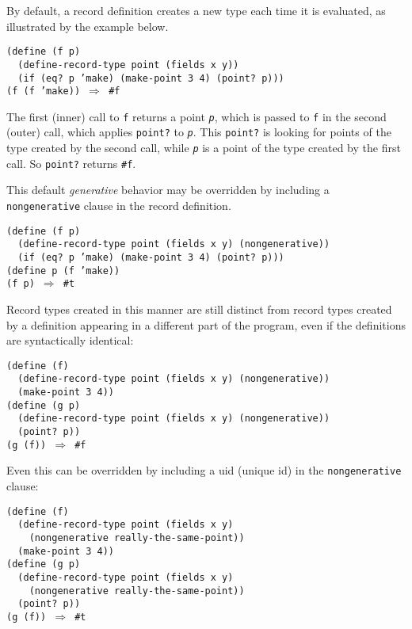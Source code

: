 By default, a record definition creates a new type each time it is
evaluated, as illustrated by the example below.


\begin{alltt}
(define (f p)
  (define-record-type point (fields x y))
  (if (eq? p 'make) (make-point 3 4) (point? p)))
(f (f 'make)) \(\Rightarrow\) \#{}f
\end{alltt}


The first (inner) call to \texttt{f} returns a point \texttt{\textit{p}}, which is
passed to \texttt{f} in the second (outer) call, which applies
\texttt{point?} to \texttt{\textit{p}}.
This \texttt{point?} is looking for points of the type created
by the second call, while \texttt{\textit{p}} is a point of the type created by
the first call.
So \texttt{point?} returns \texttt{\#{}f}.


\label{records_s3}\label{records_s4}\label{records_s5}This default \textit{generative} behavior may be overridden by including a
\texttt{nongenerative} clause in the record definition.


\begin{alltt}
(define (f p)
  (define-record-type point (fields x y) (nongenerative))
  (if (eq? p 'make) (make-point 3 4) (point? p)))
(define p (f 'make))
(f p) \(\Rightarrow\) \#{}t
\end{alltt}


Record types created in this manner are still distinct from record
types created by a definition appearing in a different part of the
program, even if the definitions are syntactically identical:


\begin{alltt}
(define (f)
  (define-record-type point (fields x y) (nongenerative))
  (make-point 3 4))
(define (g p)
  (define-record-type point (fields x y) (nongenerative))
  (point? p))
(g (f)) \(\Rightarrow\) \#{}f
\end{alltt}


\label{records_s6}\label{records_page_record_uid}Even this can be overridden by including a uid (unique id) in
the \texttt{nongenerative} clause:


\begin{alltt}
(define (f)
  (define-record-type point (fields x y)
    (nongenerative really-the-same-point))
  (make-point 3 4))
(define (g p)
  (define-record-type point (fields x y)
    (nongenerative really-the-same-point))
  (point? p))
(g (f)) \(\Rightarrow\) \#{}t
\end{alltt}


